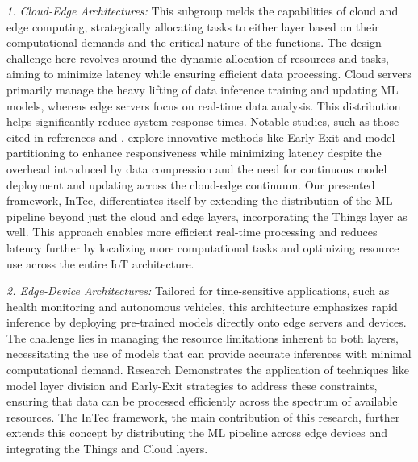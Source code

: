 \documentclass[11pt]{article}
\begin{document}
	\textit{1. Cloud-Edge Architectures:} This subgroup melds the capabilities of cloud and
	edge computing, strategically allocating tasks to either layer based on their computational demands and the critical nature of the functions. The design challenge
	here revolves around the dynamic allocation of resources and tasks, aiming to
	minimize latency while ensuring efficient data processing. Cloud servers primarily manage the heavy lifting of data inference training and updating ML
	models, whereas edge servers focus on real-time data analysis. This distribution
	helps significantly reduce system response times. Notable studies, such as those
	cited in references \cite{c25} and \cite{c32}, explore innovative methods like Early-Exit and
	model partitioning to enhance responsiveness while minimizing latency despite
	the overhead introduced by data compression and the need for continuous model
	deployment and updating across the cloud-edge continuum. Our presented framework, InTec, differentiates itself by extending the distribution of the ML pipeline
	beyond just the cloud and edge layers, incorporating the Things layer as well. This
	approach enables more efficient real-time processing and reduces latency further
	by localizing more computational tasks and optimizing resource use across the
	entire IoT architecture.
	
		\textit{2. Edge-Device Architectures:} Tailored for time-sensitive applications, such as health monitoring and autonomous vehicles, this architecture emphasizes rapid inference by deploying pre-trained models directly onto edge servers and devices. The challenge lies in managing the resource limitations inherent to both layers, necessitating the use of models that can provide accurate inferences with minimal computational demand. Research \cite{c31} Demonstrates the application of techniques like model layer division and Early-Exit strategies to address these constraints, ensuring
		that data can be processed efficiently across the spectrum of available resources.
		The InTec framework, the main contribution of this research, further extends this
		concept by distributing the ML pipeline across edge devices and integrating the
		Things and Cloud layers.
	
\end{document}
